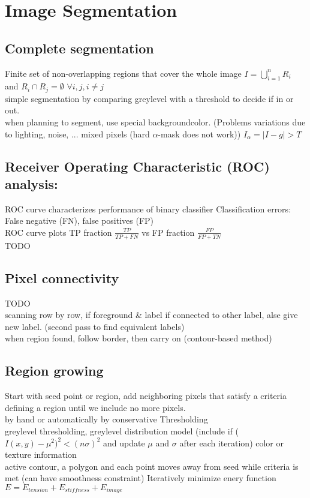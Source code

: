 \section*{Image Segmentation}
\subsection*{Complete segmentation}
Finite set of non-overlapping regions that cover the whole image $I = \bigcup_{i = 1}^{n} R_i$ and $R_i \cap R_j = \emptyset$ $\forall i, j, i \neq j$\\
 simple segmentation by comparing greylevel with a threshold to decide if in or out.\\
 when planning to segment, use special backgroundcolor. (Problems variations due to lighting, noise, ... mixed pixels (hard $\alpha$-mask does not work)) $I_\alpha = |I - g| > T$
\subsection*{Receiver Operating Characteristic (ROC) analysis:}
ROC curve characterizes performance of binary classifier Classification errors: False negative (FN), false positives (FP)\\
ROC curve plots TP fraction $\frac{TP}{TP + FN}$ vs FP fraction $\frac{FP}{FP + TN}$\\
TODO
\subsection*{Pixel connectivity}
TODO\\
 scanning row by row, if foreground \& label if connected to other label, alse give new label. (second pass to find equivalent labels)\\
 when region found, follow border, then carry on (contour-based method)
\subsection*{Region growing}
Start with seed point or region, add neighboring pixels that satisfy a criteria defining a region until we include no more pixels.\\
 by hand or automatically by conservative Thresholding\\
 greylevel thresholding, greylevel distribution model (include if ($I(x, y) - \mu^{2})^{2} < (n \sigma)^{2}$ and update $\mu$ and $\sigma$ after each iteration) color or texture information\\
 active contour, a polygon and each point moves away from seed while criteria is met (can have smoothness constraint) Iteratively minimize enery function $E = E_{tension} + E_{stiffness} + E_{image}$
